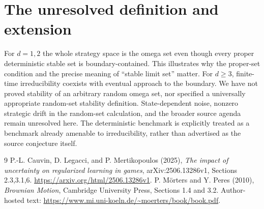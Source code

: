 \documentclass[11pt]{article}
\theoremstyle{definition}
\begin{document}
\section*{The unresolved definition and extension}
For $d=1,2$ the whole strategy space is the omega set even though
every proper deterministic stable set is boundary-contained. This
illustrates why the proper-set condition and the precise meaning of
``stable limit set'' matter. For $d\ge3$, finite-time irreducibility
coexists with eventual approach to the boundary. We have not proved
stability of an arbitrary random omega set, nor specified a universally
appropriate random-set stability definition. State-dependent noise,
nonzero strategic drift in the random-set calculation, and the broader
source agenda remain unresolved here. The deterministic benchmark is
explicitly treated as a benchmark already amenable to irreducibility,
rather than advertised as the source conjecture itself.
\begin{thebibliography}{9}
 P.-L. Cauvin, D. Legacci, and P. Mertikopoulos (2025),
\emph{The impact of uncertainty on regularized learning in games},
arXiv:2506.13286v1, Sections 2.3,3.1,6.
\url{https://arxiv.org/html/2506.13286v1}.
 P. M\"orters and Y. Peres (2010), \emph{Brownian Motion},
Cambridge University Press, Sections 1.4 and 3.2. Author-hosted text:
\url{https://www.mi.uni-koeln.de/~moerters/book/book.pdf}.
\end{thebibliography}
\end{document}
